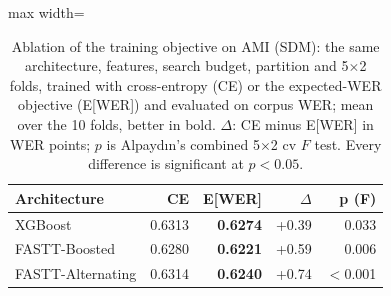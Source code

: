 \begin{table}[t]
    \centering
    \caption{Ablation of the training objective on AMI (SDM): the same architecture, features, search budget, partition and 5$\times$2 folds, trained with cross-entropy (CE) or the expected-WER objective (E[WER]) and evaluated on corpus WER; mean over the 10 folds, better in bold. $\Delta$: CE minus E[WER] in WER points; $p$ is Alpaydın's combined 5$\times$2 cv $F$ test. Every difference is significant at $p<0.05$.}
    \label{tab:ablation_loss_ami_sdm} \footnotesize \setlength{\tabcolsep}{3pt}
    \begin{adjustbox}{max width=\linewidth}
    \begin{tabular}{lrrrr}
        \toprule
        \textbf{Architecture} & \textbf{CE} & \textbf{E[WER]} & \textbf{$\Delta$} & \textbf{p (F)} \\
        \midrule
        XGBoost & 0.6313 & \textbf{0.6274} & +0.39 & 0.033 \\
        FASTT-Boosted & 0.6280 & \textbf{0.6221} & +0.59 & 0.006 \\
        FASTT-Alternating & 0.6314 & \textbf{0.6240} & +0.74 & $<$0.001 \\
        \bottomrule
    \end{tabular}
    \end{adjustbox}
\end{table}

